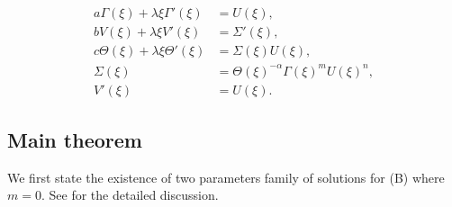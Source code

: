 \documentclass[graybox]{svmult}
\begin{document}
\begin{equation}
\begin{aligned}
 a \Gamma(\xi) + \lambda \xi \Gamma'(\xi) &= U(\xi),\\
 b V(\xi) + \lambda \xi V'(\xi) &= \Sigma'(\xi),\\
 c \Theta(\xi) + \lambda \xi \Theta'(\xi)&=\Sigma(\xi) U(\xi),\\
 \Sigma(\xi) &= \Theta(\xi)^{-\alpha} \Gamma(\xi)^m U(\xi)^n,\\
 V'(\xi)&=U(\xi).
\end{aligned} \label{eq:ss-odes}
\end{equation}

\subsection{Main theorem}

We first state the existence of two parameters family of solutions for (B) where $m=0$. See \cite{LT16_2} for the detailed discussion.
\end{document}
